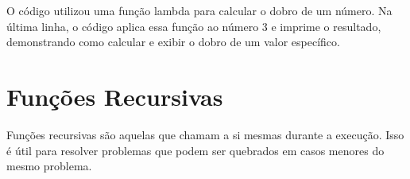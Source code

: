 \documentclass[letterpaper,10pt,english]{jupyterBook}
\begin{document}
\sphinxAtStartPar
{}

\begin{sphinxVerbatim}[commandchars=\\\{\}]
      
\end{sphinxVerbatim}

\begin{sphinxVerbatim}[commandchars=\\\{\}]
     
\end{sphinxVerbatim}

\sphinxAtStartPar
O código utilizou uma função lambda para calcular o dobro de um número. Na última linha, o código aplica essa função ao número 3 e imprime o resultado, demonstrando como calcular e exibir o dobro de um valor específico.


\section{Funções Recursivas}
\label{\detokenize{chapters/ch5/ch5:funcoes-recursivas}}
\sphinxAtStartPar
Funções recursivas são aquelas que chamam a si mesmas durante a execução. Isso é útil para resolver problemas que podem ser quebrados em casos menores do mesmo problema.

\sphinxAtStartPar
{}

\begin{sphinxVerbatim}[commandchars=\\\{\}]
 
           
         
             

  
\end{sphinxVerbatim}
\end{document}
